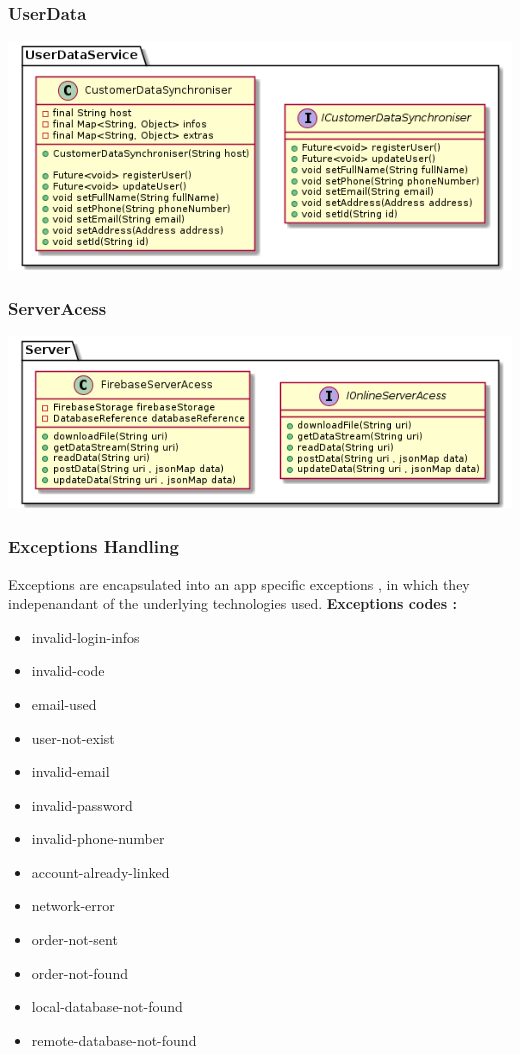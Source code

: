 \documentclass{article}
\begin{document}
 
\subsubsection{UserData}
\includegraphics[scale=0.5]{./out/MobileApp/Infrastructure/UserData/UserData.png}\\


\subsubsection{ServerAcess}
\includegraphics[scale=0.5]{./out/MobileApp/Infrastructure/ServerAcess/ServerAccess.png}\\

\subsubsection{Exceptions Handling}
Exceptions are encapsulated into an app specific exceptions , in which they indepenandant of the underlying technologies used.\newline
\textbf{Exceptions codes :}
\begin{itemize}
\item invalid-login-infos
\item invalid-code
\item email-used
\item user-not-exist
\item invalid-email
\item invalid-password
\item invalid-phone-number
\item account-already-linked
\item network-error
\item order-not-sent
\item order-not-found
\item local-database-not-found
\item remote-database-not-found
\end{itemize}
\end{document}
